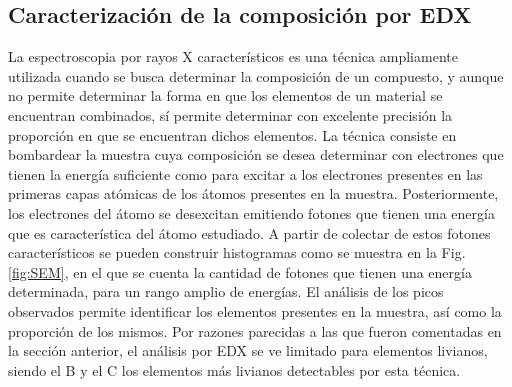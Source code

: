 \subsection{Caracterización de la composición por EDX}\label{SS:EDX}
La espectroscopia por rayos X característicos es una técnica ampliamente utilizada cuando se busca determinar la composición de un compuesto, y aunque no permite determinar la forma en que los elementos de un material se encuentran combinados, sí permite determinar con excelente precisión la proporción en que se encuentran dichos elementos. La técnica consiste en bombardear la muestra cuya composición se desea determinar con electrones que tienen la energía suficiente como para excitar a los electrones presentes en las primeras capas atómicas de los átomos presentes en la muestra. Posteriormente, los electrones del átomo se desexcitan emitiendo fotones que tienen una energía que es característica del átomo estudiado. A partir de colectar de estos fotones característicos se pueden construir histogramas como se muestra en la Fig. \ref{fig:SEM}, en el que se cuenta la cantidad de fotones que tienen una energía determinada, para un rango amplio de energías. El análisis de los picos observados permite identificar los elementos presentes en la muestra, así como la proporción de los mismos. Por razones parecidas a las que fueron comentadas en la sección anterior, el análisis por EDX se ve limitado para elementos livianos, siendo el B y el C  los elementos más livianos detectables por esta técnica.

